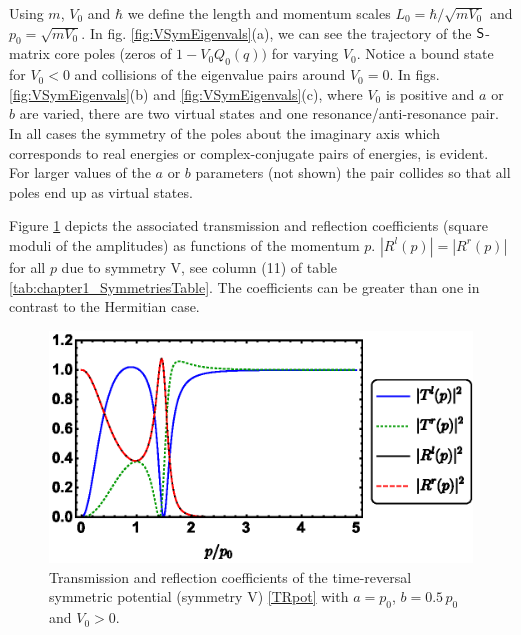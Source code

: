Using $m$, $V_0$ and $\hbar$ we define the length and momentum scales $L_0 = \hbar/\sqrt{mV_0}$ and $p_0 = \sqrt{mV_0}$. In fig. \ref{fig:VSymEigenvals}(a), we can see the trajectory of the ${\sf S}$-matrix core poles (zeros
of $1-V_0Q_0(q))$ for varying $V_0$. Notice a bound state for $V_0<0$ and collisions of the eigenvalue pairs around $V_0 = 0$. In figs. \ref{fig:VSymEigenvals}(b) and \ref{fig:VSymEigenvals}(c), where $V_0$ is positive and $a$ or $b$ are varied,
there are two virtual states and one resonance/anti-resonance pair. In all cases the symmetry of the poles about the imaginary axis
which corresponds to real energies or complex-conjugate pairs of energies, is evident. For larger values of the $a$ or $b$ parameters
(not shown)
the pair collides so that all poles end up as virtual states.

Figure \ref{fig:VSymScattAmplitudes} depicts the associated transmission and reflection coefficients (square moduli of the amplitudes) as functions of the momentum $p$. $|R^l(p)|=|R^r(p)|$ for all $p$ due to symmetry V, see column (11) of table \ref{tab:chapter1_SymmetriesTable}. The coefficients can be greater than one in contrast to the Hermitian case.

\begin{figure}
\begin{center}
	\includegraphics[width=0.9\linewidth]{Figures/VSymScattAmplitudes.eps}
\end{center}
\caption{Transmission and reflection coefficients of the time-reversal symmetric potential (symmetry V) \eqref{TRpot} with $a=p_0$, $b= 0.5\, p_0$ and $V_0>0$.}
\label{fig:VSymScattAmplitudes}
\end{figure}

%
